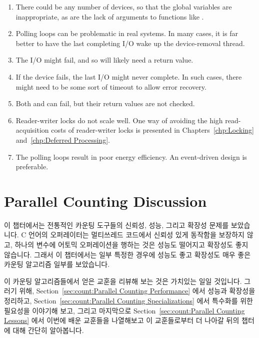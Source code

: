 {	\begin{enumerate}
	\item	There could be any number of devices, so that the
		global variables are inappropriate, as are the
		lack of arguments to functions like .
	\item	Polling loops can be problematic in real systems.
		In many cases, it is far better to have the last
		completing I/O wake up the device-removal thread.
	\item	The I/O might fail, and so  will likely
		need a return value.
	\item	If the device fails, the last I/O might never complete.
		In such cases, there might need to be some sort of
		timeout to allow error recovery.
	\item	Both  and  can
		fail, but their return values are not checked.
	\item	Reader-writer locks do not scale well.
		One way of avoiding the high read-acquisition costs
		of reader-writer locks is presented in
		Chapters~\ref{chp:Locking}
		and~\ref{chp:Deferred Processing}.
	\item	The polling loops result in poor energy efficiency.
		An event-driven design is preferable.
	\end{enumerate}
	\fi
} \QuickQuizEnd

\section{Parallel Counting Discussion}
\label{sec:count:Parallel Counting Discussion}

이 챕터에서는 전통적인 카운팅 도구들의 신뢰성, 성능, 그리고 확장성 문제를
보았습니다.
C 언어의 \co{++} 오퍼레이터는 멀티쓰레드 코드에서 신뢰성 있게 동작함을 보장하지
않고, 하나의 변수에 어토믹 오퍼레이션을 행하는 것은 성능도 떨어지고 확장성도
좋지 않습니다.
그래서 이 챕터에서는 일부 특정한 경우에 성능도 좋고 확장성도 매우 좋은 카운팅
알고리즘 일부를 보았습니다.

이 카운팅 알고리즘들에서 얻은 교훈을 리뷰해 보는 것은 가치있는 일일 것입니다.
그러기 위해,
Section~\ref{sec:count:Parallel Counting Performance} 에서 성능과 확장성을
정리하고,
Section~\ref{sec:count:Parallel Counting Specializations} 에서 특수화를 위한
필요성을 이야기해 보고,
그리고 마지막으로
Section~\ref{sec:count:Parallel Counting Lessons} 에서 이번에 배운 교훈들을
나열해보고 이 교훈들로부터 더 나아갈 뒤의 챕터에 대해 간단히 알아봅니다.
\iffalse

